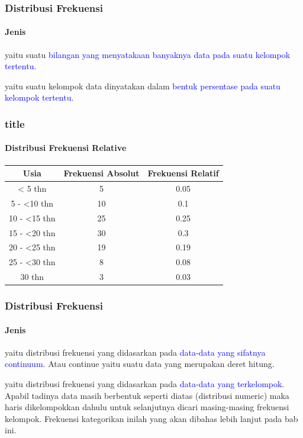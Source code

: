 \documentclass[main.tex]{subfiles}
\begin{document}
\begin{frame}[c]
	\frametitle{Distribusi Frekuensi}
	\framesubtitle{Jenis}
	\begin{description}
		\item<1->[Distribusi frekuensi absolute] yaitu suatu \textcolor{blue}{bilangan yang menyatakaan banyaknya data pada suatu kelompok tertentu.}
		\item<2->[Distribusi frekuensi relative] yaitu suatu kelompok data dinyatakan dalam \textcolor{blue}{bentuk persentase pada suatu kelompok tertentu.}
	\end{description}
\end{frame}

\begin{frame}[c]
	\frametitle{title}
	\framesubtitle{Distribusi Frekuensi Relative}
	\begin{table}[htb]
		\begin{tabular}{ccc}
			\hline
			Usia          &  Frekuensi Absolut  &  Frekuensi Relatif  \\
			\hline
			< 5 thn       &  5                  &  0.05  \\
			5 - <10 thn   &  10                 &  0.1  \\
			10 - <15 thn  &  25                 &  0.25  \\
			15 - <20 thn  &  30                 &  0.3  \\
			20 - <25 thn  &  19                 &  0.19  \\
			25 - <30 thn  &  8                  &  0.08  \\
			30 thn        &  3                  &  0.03  \\
			\hline
		\end{tabular}
	\end{table}
\end{frame}
\begin{frame}[c]
	\frametitle{Distribusi Frekuensi}
	\framesubtitle{Jenis}
	\begin{description}
		\item<1->[Distribusi frekuensi numeric] yaitu distribusi frekuensi yang didasarkan pada \textcolor{blue}{ data-data yang sifatnya continuum}. Atau continue yaitu suatu data yang merupakan deret hitung.
		\item<2->[Distribusi kategorikal] yaitu distribusi frekuensi yang didasarkan pada \textcolor{blue}{data-data yang terkelompok.} Apabil tadinya data masih berbentuk seperti diatas (distribusi numeric) maka haris dikelompokkan dahulu untuk selanjutnya dicari masing-masing frekuensi kelompok. Frekuensi kategorikan inilah yang akan dibahas lebih lanjut pada bab ini.
	\end{description}
\end{frame}
\end{document}
